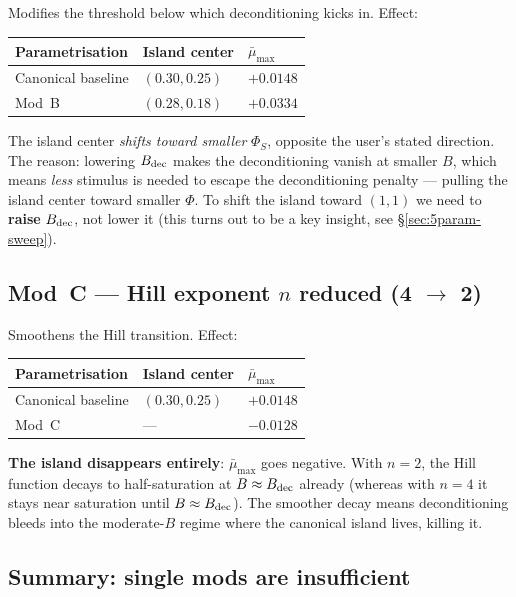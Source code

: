 \documentclass[11pt,a4paper]{article}
\theoremstyle{definition}
\begin{document}
Modifies the threshold below which deconditioning kicks in. Effect:
\begin{center}\small
\begin{tabular}{lll}
\toprule
Parametrisation & Island center & $\bar\mu_{\max}$ \\
\midrule
Canonical baseline & $(0.30, 0.25)$ & $+0.0148$ \\
Mod~B              & $(0.28, 0.18)$ & $+0.0334$ \\
\bottomrule
\end{tabular}
\end{center}
The island center \emph{shifts toward smaller} $\Phi_S$, opposite the user's stated direction. The reason: lowering $B_{\rm dec}$ makes the deconditioning vanish at smaller $B$, which means \emph{less} stimulus is needed to escape the deconditioning penalty — pulling the island center toward smaller $\Phi$. To shift the island toward $(1, 1)$ we need to \textbf{raise} $B_{\rm dec}$, not lower it (this turns out to be a key insight, see §\ref{sec:5param-sweep}).

\subsection{Mod~C — Hill exponent $n$ reduced (4 $\to$ 2)}

Smoothens the Hill transition. Effect:
\begin{center}\small
\begin{tabular}{lll}
\toprule
Parametrisation & Island center & $\bar\mu_{\max}$ \\
\midrule
Canonical baseline & $(0.30, 0.25)$ & $+0.0148$ \\
Mod~C              & ---            & $-0.0128$ \\
\bottomrule
\end{tabular}
\end{center}
\textbf{The island disappears entirely}: $\bar\mu_{\max}$ goes negative. With $n = 2$, the Hill function decays to half-saturation at $B \approx B_{\rm dec}$ already (whereas with $n = 4$ it stays near saturation until $B \approx B_{\rm dec}$). The smoother decay means deconditioning bleeds into the moderate-$B$ regime where the canonical island lives, killing it.

\subsection{Summary: single mods are insufficient}
\end{document}
